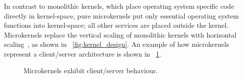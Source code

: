 


In contrast to monolithic kernels, which place operating system specific code
directly in kernel-space, pure microkernels put only essential operating
system functions into
kernel-space; all other services are placed outside the kernel.  Microkernels
replace the vertical scaling of monolithic kernels with horizontal
scaling~\cite{stallings2005}, as shown in \figurename~\ref{fig:kernel_design}.
An example of how microkernels represent a client/server architecture is
shown in \figurename~\ref{fig:microkernel_servers}.


	\begin{figure}[tb]
	\begin{center}
	\end{center}
	\caption{Microkernels exhibit client/server behaviour.}
	\label{fig:microkernel_servers}
	\end{figure}

